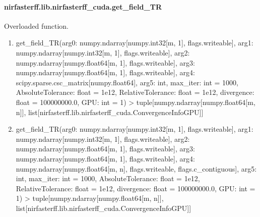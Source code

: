 \documentclass[letterpaper,10pt,english]{sphinxmanual}
\begin{document}
\sphinxstepscope


\paragraph{nirfasterff.lib.nirfasterff\_cuda.get\_field\_TR}
\label{\detokenize{_autosummary/nirfasterff.lib.nirfasterff_cuda.get_field_TR:nirfasterff-lib-nirfasterff-cuda-get-field-tr}}\label{\detokenize{_autosummary/nirfasterff.lib.nirfasterff_cuda.get_field_TR::doc}}

\begin{fulllineitems}
\label{\detokenize{_autosummary/nirfasterff.lib.nirfasterff_cuda.get_field_TR:nirfasterff.lib.nirfasterff_cuda.get_field_TR}}
\pysigstartsignatures
\pysiglinewithargsret
{}
{\sphinxparamcomma {}}
{}
\pysigstopsignatures
\sphinxAtStartPar
Overloaded function.
\begin{enumerate}
%
\item {} 
\sphinxAtStartPar
get\_field\_TR(arg0: numpy.ndarray{[}numpy.int32{[}m, 1{]}, flags.writeable{]}, arg1: numpy.ndarray{[}numpy.int32{[}m, 1{]}, flags.writeable{]}, arg2: numpy.ndarray{[}numpy.float64{[}m, 1{]}, flags.writeable{]}, arg3: numpy.ndarray{[}numpy.float64{[}m, 1{]}, flags.writeable{]}, arg4: scipy.sparse.csc\_matrix{[}numpy.float64{]}, arg5: int, max\_iter: int = 1000, AbsoluteTolerance: float = 1e\sphinxhyphen{}12, RelativeTolerance: float = 1e\sphinxhyphen{}12, divergence: float = 100000000.0, GPU: int = \sphinxhyphen{}1) \sphinxhyphen{}\textgreater{} tuple{[}numpy.ndarray{[}numpy.float64{[}m, n{]}{]}, list{[}nirfasterff.lib.nirfasterff\_cuda.ConvergenceInfoGPU{]}{]}

\item {} 
\sphinxAtStartPar
get\_field\_TR(arg0: numpy.ndarray{[}numpy.int32{[}m, 1{]}, flags.writeable{]}, arg1: numpy.ndarray{[}numpy.int32{[}m, 1{]}, flags.writeable{]}, arg2: numpy.ndarray{[}numpy.float64{[}m, 1{]}, flags.writeable{]}, arg3: numpy.ndarray{[}numpy.float64{[}m, 1{]}, flags.writeable{]}, arg4: numpy.ndarray{[}numpy.float64{[}m, n{]}, flags.writeable, flags.c\_contiguous{]}, arg5: int, max\_iter: int = 1000, AbsoluteTolerance: float = 1e\sphinxhyphen{}12, RelativeTolerance: float = 1e\sphinxhyphen{}12, divergence: float = 100000000.0, GPU: int = \sphinxhyphen{}1) \sphinxhyphen{}\textgreater{} tuple{[}numpy.ndarray{[}numpy.float64{[}m, n{]}{]}, list{[}nirfasterff.lib.nirfasterff\_cuda.ConvergenceInfoGPU{]}{]}

\end{enumerate}

\end{fulllineitems}
\end{document}
